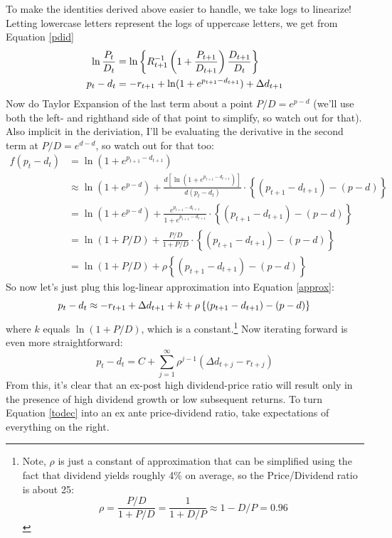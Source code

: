 \documentclass[a4paper,12pt]{scrartcl}
\begin{document}
To make the identities derived above easier to handle, we take
logs to linearize!
Letting lowercase letters represent the logs of uppercase letters, we
get from Equation \ref{pdid}
\begin{align}
    \ln \frac{P_t}{D_t} &=
	\ln \left\{ R^{-1}_{t+1} \left( 1 + \frac{P_{t+1}}{D_{t+1}}\right) \frac{D_{t+1}}{D_t}
	\right\} \notag \\
	p_t - d_t &= -r_{t+1} + \ln( 1 + e^{p_{t+1} - d_{t+1}})
	+ \Delta d_{t+1} \label{approx}
\end{align}
Now do Taylor Expansion of the last term about a point $P/D = e^{p-d}$
(we'll use both the left- and righthand side of that point to
simplify, so watch out for that).  Also implicit in the
deriviation, I'll be evaluating the derivative in the second
term at $P/D = e^{d-d}$, so watch out for that too:
\begin{align*}
    f(p_t - d_t) &= \ln(1 + e^{p_{t+1} - d_{t+1}}) \\
    &\approx \ln(1 + e^{p - d}) +
	\frac{d\left[\ln(1 + e^{p_{t+1} - d_{t+1}})\right]}{d(p_t - d_t)}
	\cdot \left\{ (p_{t+1}-d_{t+1}) - (p-d) \right\} \\
    &= \ln(1 + e^{p - d}) +
	\frac{e^{p_{t+1} - d_{t+1}}}{1+e^{p_{t+1} - d_{t+1}}}
	\cdot \left\{ (p_{t+1}-d_{t+1}) - (p-d) \right\} \\
     &= \ln(1 + {P}/{D}) +
	\frac{P/D}{1+P/D}
	\cdot \left\{ (p_{t+1}-d_{t+1}) - (p-d) \right\} \\
    &= \ln(1 + {P}/{D}) +
	\rho\left\{ (p_{t+1}-d_{t+1}) - (p-d) \right\}
\end{align*}
So now let's just plug this log-linear approximation into Equation
\ref{approx}:
\begin{equation}
    p_t - d_t \approx -r_{t+1}
	+ \Delta d_{t+1} +  k +
	\rho\left\{ (p_{t+1}-d_{t+1}) - (p-d) \right\} \\
\end{equation}
where $k$ equals $\ln(1+P/D)$, which is a constant.\footnote{Note,
$\rho$ is just a constant of approximation that can be simplified
using the fact that dividend yields roughly 4\% on average, so
the Price/Dividend ratio is about 25:
    \[ \rho = \frac{P/D}{1+P/D} = \frac{1}{1+ D/P} \approx 1 - D/P = 0.96 \]
}
Now iterating forward is even more straightforward:
\begin{equation}
    \label{todec}
    p_t - d_t = C +  \sum^\infty_{j=1} \rho^{j-1} (\Delta d_{t+j}
	- r_{t+j})
\end{equation}
From this, it's clear that an ex-post high dividend-price ratio will result
only in the presence of high dividend growth or low subsequent returns.
To turn Equation \ref{todec} into an ex ante price-dividend ratio,
take expectations of everything on the right.
\end{document}
